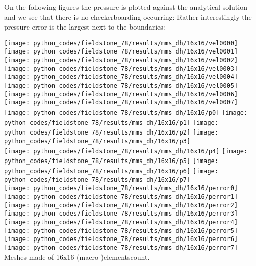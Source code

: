 On the following figures the pressure is plotted against the analytical solution and 
we see that there is no checkerboarding occurring:
Rather interestingly the pressure error is the largest next to the boundaries:

\begin{center}
\texttt{[image: python\_codes/fieldstone\_78/results/mms\_dh/16x16/vel0000]}
\texttt{[image: python\_codes/fieldstone\_78/results/mms\_dh/16x16/vel0001]}
\texttt{[image: python\_codes/fieldstone\_78/results/mms\_dh/16x16/vel0002]}
\texttt{[image: python\_codes/fieldstone\_78/results/mms\_dh/16x16/vel0003]}\\
\texttt{[image: python\_codes/fieldstone\_78/results/mms\_dh/16x16/vel0004]}
\texttt{[image: python\_codes/fieldstone\_78/results/mms\_dh/16x16/vel0005]}
\texttt{[image: python\_codes/fieldstone\_78/results/mms\_dh/16x16/vel0006]}
\texttt{[image: python\_codes/fieldstone\_78/results/mms\_dh/16x16/vel0007]}\\
\texttt{[image: python\_codes/fieldstone\_78/results/mms\_dh/16x16/p0]}
\texttt{[image: python\_codes/fieldstone\_78/results/mms\_dh/16x16/p1]}
\texttt{[image: python\_codes/fieldstone\_78/results/mms\_dh/16x16/p2]}
\texttt{[image: python\_codes/fieldstone\_78/results/mms\_dh/16x16/p3]}\\
\texttt{[image: python\_codes/fieldstone\_78/results/mms\_dh/16x16/p4]}
\texttt{[image: python\_codes/fieldstone\_78/results/mms\_dh/16x16/p5]}
\texttt{[image: python\_codes/fieldstone\_78/results/mms\_dh/16x16/p6]}
\texttt{[image: python\_codes/fieldstone\_78/results/mms\_dh/16x16/p7]}\\
\texttt{[image: python\_codes/fieldstone\_78/results/mms\_dh/16x16/perror0]}
\texttt{[image: python\_codes/fieldstone\_78/results/mms\_dh/16x16/perror1]}
\texttt{[image: python\_codes/fieldstone\_78/results/mms\_dh/16x16/perror2]}
\texttt{[image: python\_codes/fieldstone\_78/results/mms\_dh/16x16/perror3]}\\
\texttt{[image: python\_codes/fieldstone\_78/results/mms\_dh/16x16/perror4]}
\texttt{[image: python\_codes/fieldstone\_78/results/mms\_dh/16x16/perror5]}
\texttt{[image: python\_codes/fieldstone\_78/results/mms\_dh/16x16/perror6]}
\texttt{[image: python\_codes/fieldstone\_78/results/mms\_dh/16x16/perror7]}\\
{\captionfont Meshes  made of 16x16 (macro-)elementscount.} 
\end{center}



